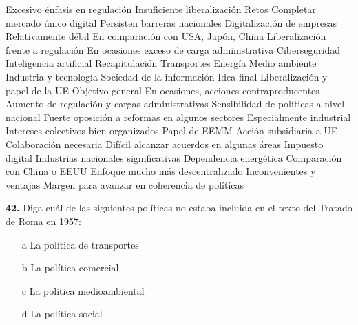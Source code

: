 \documentclass{nuevotema}
\begin{document}
\begin{esquemal}
				\4 Excesivo énfasis en regulación
				\4[] Insuficiente liberalización
		\2 Retos
			\3 Completar mercado único digital
				\4 Persisten barreras nacionales
			\3 Digitalización de empresas
				\4 Relativamente débil
				\4[] En comparación con USA, Japón, China
			\3 Liberalización frente a regulación
				\4 En ocasiones exceso de carga administrativa
			\3 Ciberseguridad
			\3 Inteligencia artificial
	\1[] 
		\2 Recapitulación
			\3 Transportes
			\3 Energía
			\3 Medio ambiente
			\3 Industria y tecnología
			\3 Sociedad de la información
		\2 Idea final
			\3 Liberalización y papel de la UE
				\4 Objetivo general
				\4 En ocasiones, acciones contraproducentes
				\4[] Aumento de regulación y cargas administrativas
			\3 Sensibilidad de políticas a nivel nacional
				\4 Fuerte oposición a reformas en algunos sectores
				\4[] Especialmente industrial
				\4[] Intereses colectivos bien organizados
			\3 Papel de EEMM
				\4 Acción subsidiaria a UE
				\4 Colaboración necesaria
				\4 Difícil alcanzar acuerdos en algunas áreas
				\4[] Impuesto digital
				\4[] Industrias nacionales significativas
				\4[] Dependencia energética
			\3 Comparación con China o EEUU
				\4 Enfoque mucho más descentralizado
				\4 Inconvenientes y ventajas
				\4 Margen para avanzar en coherencia de políticas
\end{esquemal}



































\preguntas


\textbf{42.} Diga cuál de las siguientes políticas no estaba incluida en el texto del Tratado de Roma en 1957:

\begin{itemize}
	\item[a] La política de transportes
	\item[b] La política comercial
	\item[c] La política medioambiental
	\item[d] La política social
\end{itemize}
\end{document}

